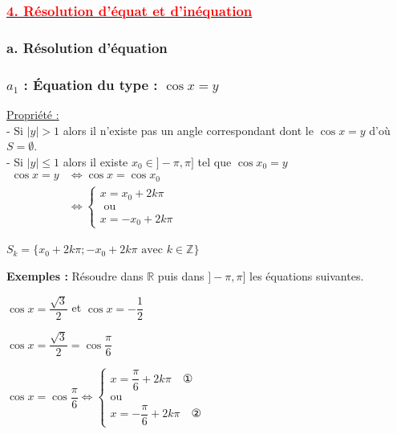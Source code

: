 \documentclass[12pt,a4paper]{article}
\newcounter{solution}
\begin{document}
\subsubsection*{\underline{\textbf{\textcolor{red}{4. Résolution d'équat et d'inéquation }}}}
\subsubsection*{\textbf{a. Résolution d'équation}}

\subsubsection*{\textbf{ $a_1$ : Équation du type : $\cos x = y$ }}

\underline{Propriété :} \\
- Si $|y| > 1$ alors il n'existe pas un angle correspondant dont le $\cos x = y$ d'où $S = \emptyset$. \\
- Si $|y| \le 1$ alors il existe $x_0 \in ]-\pi, \pi]$ tel que $\cos x_0 = y$ \\

$
\begin{aligned}
   \cos x = y &\iff \cos x = \cos x_0\\
              &\iff \begin{cases}
                   x = x_0 + 2k\pi\\
                   \text{ ou }\\
                    x = -x_0 + 2k\pi
              \end{cases}
\end{aligned}
$

$\boxed{S_k = \{x_0 + 2k\pi; -x_0 + 2k\pi \text{ avec } k \in \mathbb{Z}\}}$

\vspace{1cm}

\textbf{Exemples :} Résoudre dans $\mathbb{R}$ puis dans $]-\pi, \pi]$ les équations suivantes.

\vspace{0.3cm}

$\cos x = \dfrac{\sqrt{3}}{2}$ \quad et \quad $\cos x = -\dfrac{1}{2}$

\vspace{0.3cm}

$\cos x = \dfrac{\sqrt{3}}{2} = \cos \dfrac{\pi}{6}$

$\cos x = \cos \dfrac{\pi}{6} \iff \begin{cases} x = \dfrac{\pi}{6} + 2k\pi \quad \text{①} \\ \text{ou} \\ x = -\dfrac{\pi}{6} + 2k\pi \quad \text{②} \end{cases}$
\end{document}
